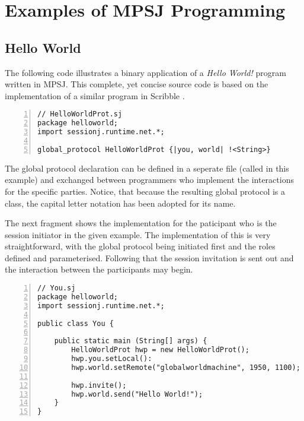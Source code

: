\cleardoublepage
\chapter{Examples of MPSJ Programming}
\label{ch:examples}

\section{Hello World}

The following code illustrates a binary application of a \textit{Hello World!} program written in MPSJ. This complete, yet concise source code is based on the implementation of a similar program in Scribble \cite{scribble}.

\begin{lstlisting}[basicstyle=\LISTINGSTYLE, numbers=left, caption=Global Declaration of \textit{HelloWorldProt}]
// HelloWorldProt.sj
package helloworld; 
import sessionj.runtime.net.*;
 
global_protocol HelloWorldProt {|you, world| !<String>}
\end{lstlisting}

The global protocol declaration can be defined in a seperate file (called  in this example) and exchanged between programmers who implement the interactions for the specific parties. Notice, that because the resulting global protocol is a class, the capital letter notation has been adopted for its name.

The next fragment shows the implementation for the paticipant  who is the session initiator in the given example. The implementation of this is very straightforward, with the global protocol being initiated first and the roles defined and parameterised. Following that the session invitation is sent out and the interaction between the participants may begin.

\begin{lstlisting}[basicstyle=\LISTINGSTYLE, numbers=left, caption=Implementation for participant \textit{you}]
// You.sj
package helloworld; 
import sessionj.runtime.net.*;
 
public class You {
	
	public static main (String[] args) {
		HelloWorldProt hwp = new HelloWorldProt();
		hwp.you.setLocal():
		hwp.world.setRemote("globalworldmachine", 1950, 1100);
	
		hwp.invite();
		hwp.world.send("Hello World!");
	} 
}
\end{lstlisting}


